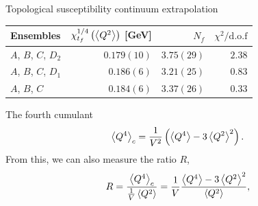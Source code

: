 \documentclass[10pt,show notes on second screen]{beamer}
\begin{document}
\begin{frame}{Topological susceptibility continuum extrapolation}
\begin{table}
    \centering
    \begin{tabular}{l r r r}
        \toprule
        Ensembles               & $\chi_{t_f}^{1/4}\left( \left\langle{Q^2}\right\rangle \right)$ [GeV]   & $N_f$         & $\chi^2/\mathrm{d.o.f}$ \\ \midrule
        $A$, $B$, $C$, $D_2$    & $0.179(10)$                                           & $3.75(29)$    & $2.38$ \\
        $A$, $B$, $C$, $D_1$    & $0.186(6)$                                            & $3.21(25)$    & $0.83$ \\
        $A$, $B$, $C$           & $0.184(6)$                                            & $3.37(26)$    & $0.33$ \\
        \bottomrule
    \end{tabular}
\end{table}
\end{frame}

\begin{frame}{The fourth cumulant}
\begin{align*}
    \left\langle{Q^4}\right\rangle_c = \frac{1}{V^2}\left(\left\langle{Q^4}\right\rangle - 3\left\langle{Q^2}\right\rangle^2\right).
\end{align*}%
From this, we can also measure the ratio $R$,
\begin{align*}
    R = \frac{\left\langle{Q^4}\right\rangle_c}{\frac{1}{V}\left\langle{Q^2}\right\rangle} = \frac{1}{V}\frac{\left\langle{Q^4}\right\rangle - 3\left\langle{Q^2}\right\rangle^2}{\left\langle{Q^2}\right\rangle},
\end{align*}
\end{frame}
\end{document}
